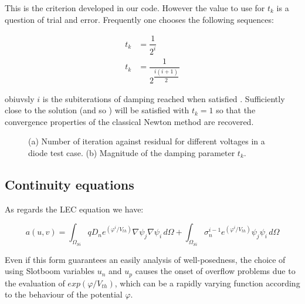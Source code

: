 This is the criterion developed in our code. However the value to use for $t_k$ is a question of trial and error. Frequently one chooses the following sequences:

\begin{align}
t_k & = \dfrac{1}{2^i} \\
t_k & = \dfrac{1}{2^{\dfrac{i(i+1)}{2}}}  
\end{align}

obiuvsly $i$ is the subiterations of damping reached when satisfied . Sufficiently close to the solution  (and so ) will be satisfied with $t_k=1$ so that the convergence properties of the classical Newton method are recovered.
 

\begin{figure}[!h]
\centering



\caption{(a) Number of iteration against residual for different voltages in a diode test case. (b) Magnitude of the damping parameter $t_k$.}

\end{figure}




\subsection{Continuity equations}
\label{sec: continuity equations}

As regards the LEC equation we have:

\begin{equation}
\label{eq: weak formulation displacement}
a(u,v) =  \int_{\Omega_{Si}}  q D_n e^{(\varphi^{i}/V_{th})} \nabla \psi_j \nabla \psi_i \, d\Omega + \int_{\Omega_{Si}} \sigma_n^{i-1} e^{(\varphi^{i}/V_{th})} \psi_j \psi_i \, d\Omega
\end{equation}

Even if this form guarantees an easily analysis of well-posedness, the choice of using Slotboom variables $u_n$ and $u_p$ causes the onset of overflow problems due to the evaluation of $exp(\varphi/V_{th})$, which can be a rapidly varying function according to the behaviour of the potential $\varphi$.

